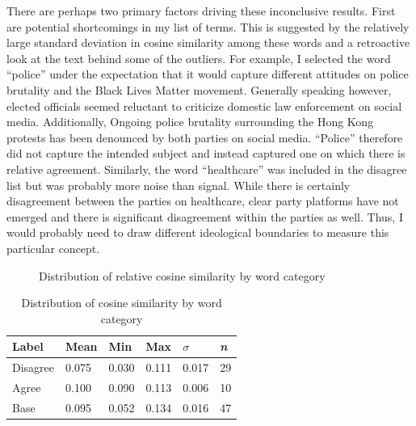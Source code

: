 \documentclass[../embeddings.tex]{subfiles}
\begin{document}
There are perhaps two primary factors driving these inconclusive results. First are potential shortcomings in my list of terms. This is suggested by the relatively large standard deviation in cosine similarity among these words and a retroactive look at the text behind some of the outliers. For example, I selected the word ``police'' under the expectation that it would capture different attitudes on police brutality and the Black Lives Matter movement. Generally speaking however, elected officials seemed reluctant to criticize domestic law enforcement on social media. Additionally, Ongoing police brutality surrounding the Hong Kong protests has been denounced by both parties on social media. ``Police'' therefore did not capture the intended subject and instead captured one on which there is relative agreement. Similarly, the word ``healthcare'' was included in the disagree list but was probably more noise than signal. While there is certainly disagreement between the parties on healthcare, clear party platforms have not emerged and there is significant disagreement within the parties as well. Thus, I would probably need to draw different ideological boundaries to measure this particular concept. 

\begin{figure}[h]
  \centering
  \qquad
  \caption{Distribution of relative cosine similarity by word category}
\end{figure}

\begin{table}[h]
    \caption{Distribution of cosine similarity by word category}
    \begin{tabular}{llllll}
      \toprule
      Label    & Mean  & Min   & Max  & $\sigma$ & \textit{n}\\
      \midrule
      Disagree & 0.075 & 0.030  & 0.111 & 0.017   & 29\\
      Agree    & 0.100 & 0.090  & 0.113 & 0.006   & 10\\
      Base     & 0.095 & 0.052 & 0.134 & 0.016   & 47\\
      \bottomrule
    \end{tabular}
    \label{table:rcsdist}
\end{table}
\end{document}
